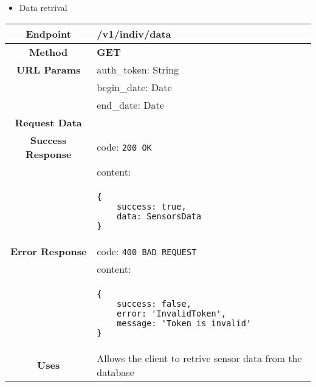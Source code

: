     \begin{itemize}
        \item Data retrival
    \end{itemize}
    \begin{adjustwidth}{1cm}{}
        \begin{longtable}{|c|l|}
            \hline
            \textbf{Endpoint} & /v1/indiv/data \\
            \hline
            \textbf{Method} & \textbf{GET} \\
            \hline
            \textbf{URL Params} &  auth\_token: String \\
            & begin\_date: Date \\
            & end\_date: Date \\
            \hline
            \textbf{Request Data} &  \\
            \hline
            \textbf{Success Response} & code: \texttt{200 OK} \\
            &                           content: \\
            & \begin{minipage}[t]{0.5\textwidth}
                \begin{adjustwidth}{1.5cm}{}
                \begin{verbatim}
{
    success: true, 
    data: SensorsData
}
                \end{verbatim}
                \end{adjustwidth}
              \end{minipage} \\
              \hline
            \textbf{Error Response} & code: \texttt{400 BAD REQUEST} \\
            &                         content: \\
            & \begin{minipage}[t]{0.7\textwidth}
                \begin{adjustwidth}{1.5cm}{}
                \begin{verbatim}
{
    success: false, 
    error: 'InvalidToken',
    message: 'Token is invalid'
}
                \end{verbatim}
                \end{adjustwidth}
              \end{minipage} \\
              \hline
            \textbf{Uses} & Allows the client to retrive sensor data from the database \\

\end{longtable}
\end{adjustwidth}
